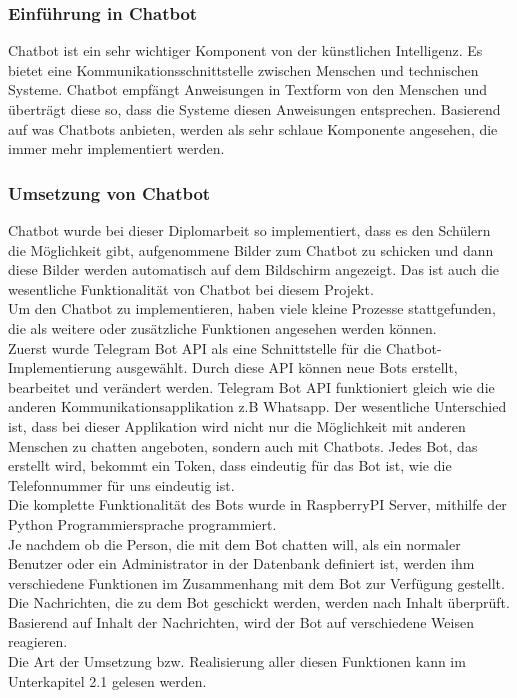 \subsubsection{Einführung in Chatbot}
Chatbot ist ein sehr wichtiger Komponent von der künstlichen Intelligenz. Es bietet eine Kommunikationsschnittstelle zwischen Menschen und technischen Systeme. Chatbot empfängt Anweisungen in Textform von den Menschen und überträgt diese so, dass die Systeme diesen Anweisungen entsprechen. Basierend auf was Chatbots anbieten, werden als sehr schlaue Komponente angesehen, die immer mehr implementiert werden.\cite{einstein,knuthwebsite}
\subsubsection{Umsetzung von Chatbot}
Chatbot wurde bei dieser Diplomarbeit so implementiert, dass es den Schülern die Möglichkeit gibt, aufgenommene Bilder zum Chatbot zu schicken und dann diese Bilder werden automatisch auf dem Bildschirm angezeigt. Das ist auch die wesentliche Funktionalität von Chatbot bei diesem Projekt. \\
Um den Chatbot zu implementieren, haben viele kleine Prozesse stattgefunden, die als weitere oder zusätzliche Funktionen angesehen werden können.\\
Zuerst wurde Telegram Bot API als eine Schnittstelle für die Chatbot-Implementierung ausgewählt. Durch diese API können neue Bots erstellt, bearbeitet und verändert werden. Telegram Bot API funktioniert gleich wie die anderen Kommunikationsapplikation z.B Whatsapp. Der wesentliche Unterschied ist, dass bei dieser Applikation wird nicht nur die Möglichkeit mit anderen Menschen zu chatten angeboten, sondern auch mit Chatbots. Jedes Bot, das erstellt wird, bekommt ein Token, dass eindeutig für das Bot ist, wie die Telefonnummer für uns eindeutig ist. \\
Die komplette Funktionalität des Bots wurde in RaspberryPI Server, mithilfe der Python Programmiersprache programmiert. \\
Je nachdem ob die Person, die mit dem Bot chatten will, als ein normaler Benutzer oder ein Administrator in der Datenbank definiert ist, werden ihm verschiedene Funktionen im Zusammenhang mit dem Bot zur Verfügung gestellt. Die Nachrichten, die zu dem Bot geschickt werden, werden nach Inhalt überprüft. Basierend auf Inhalt der Nachrichten, wird der Bot auf verschiedene Weisen reagieren.\\
Die Art der Umsetzung bzw. Realisierung aller diesen Funktionen kann im Unterkapitel 2.1 gelesen werden.   

